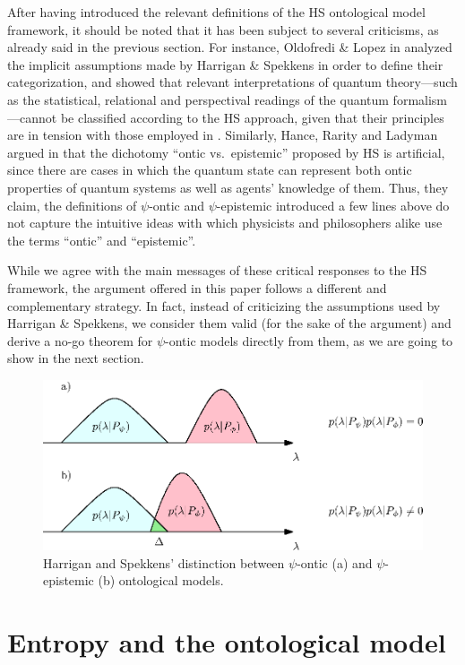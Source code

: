 \documentclass[10pt,twocolumn, nofootinbib]{revtex4-2}
\begin{document}
After having introduced the relevant definitions of the HS ontological model framework, it should be noted that it has been subject to several criticisms, as already said in the previous section. For instance, Oldofredi \& Lopez in \cite{Oldofredi:2020b} analyzed the implicit assumptions made by Harrigan \& Spekkens in order to define their categorization, and showed that relevant interpretations of quantum theory---such as the statistical, relational and perspectival readings of the quantum formalism---cannot be classified according to the HS approach, given that their principles are in tension with those employed in \cite{Harrigan:2010}. Similarly, Hance, Rarity and Ladyman argued in \cite{Ladyman:2021} that the dichotomy ``ontic vs.\ epistemic'' proposed by HS is artificial, since there are cases in which the quantum state can represent both ontic properties of quantum systems as well as agents' knowledge of them. Thus, they claim, the definitions of $\psi$-ontic and $\psi$-epistemic introduced a few lines above do not capture the intuitive ideas with which physicists and philosophers alike use the terms ``ontic'' and ``epistemic''.

While we agree with the main messages of these critical responses to the HS framework, the argument offered in this paper follows a different and complementary strategy. In fact, instead of criticizing the assumptions used by Harrigan \& Spekkens, we consider them valid (for the sake of the argument) and derive a no-go theorem for $\psi$-ontic models directly from them, as we are going to show in the next section.


\begin{figure}
\includegraphics[scale=.7]{ontic}
\caption{\footnotesize{Harrigan and Spekkens' distinction between $\psi$-ontic (a) and $\psi$-epistemic (b) ontological models.}}\label{overlap}
\end{figure}

\section{Entropy and the ontological model}
\end{document}
